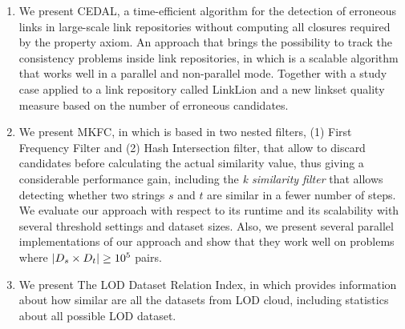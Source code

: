\begin{enumerate}
    \item We present CEDAL\cite{valdestilhas2017cedal}, a time-efficient algorithm for the detection of erroneous links in large-scale link repositories without computing all closures required by the property axiom. An approach that brings the possibility to track the consistency problems inside link repositories, in which is a scalable algorithm that works well in a parallel and non-parallel mode. Together with a study case applied to a link repository called LinkLion and a new linkset quality measure based on the number of erroneous candidates.
	
	\item We present MKFC\cite{valdestilhas2017high}, in which is based in two nested filters, (1) First Frequency Filter and (2) Hash Intersection filter, that allow to discard candidates before calculating the actual similarity value, thus giving a considerable performance gain, including the \emph{k similarity filter} that allows detecting whether two strings $s$ and $t$ are similar in a fewer number of steps. We evaluate our approach with respect to its runtime and its scalability with several threshold settings and dataset sizes. Also, we present several parallel implementations of our approach and show that they work well on problems where $|{D_s}{} \times {\ensuremath{D_t}}{}| \geq 10^5$ pairs.
	
    \item We present The LOD Dataset Relation Index\cite{}, in which provides information about how similar are all the datasets from LOD cloud, including statistics about all possible LOD dataset.
    
\end{enumerate}


